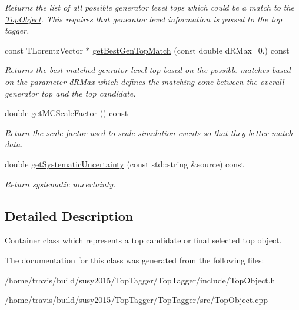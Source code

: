 \begin{DoxyCompactItemize}
\begin{DoxyCompactList}\small\item\em Returns the list of all possible generator level tops which could be a match to the \hyperlink{classTopObject}{Top\-Object}. This requires that generator level information is passed to the top tagger. \end{DoxyCompactList}\item 
\hypertarget{classTopObject_a80c459ce3d60d1402087ceead3999e45}{const T\-Lorentz\-Vector $\ast$ \hyperlink{classTopObject_a80c459ce3d60d1402087ceead3999e45}{get\-Best\-Gen\-Top\-Match} (const double d\-R\-Max=0.) const }\label{classTopObject_a80c459ce3d60d1402087ceead3999e45}

\begin{DoxyCompactList}\small\item\em Returns the best matched genrator level top based on the possible matches based on the parameter d\-R\-Max which defines the matching cone between the overall generator top and the top candidate. \end{DoxyCompactList}\item 
\hypertarget{classTopObject_a77edcc1258a253b60747eb557c12dd52}{double \hyperlink{classTopObject_a77edcc1258a253b60747eb557c12dd52}{get\-M\-C\-Scale\-Factor} () const }\label{classTopObject_a77edcc1258a253b60747eb557c12dd52}

\begin{DoxyCompactList}\small\item\em Return the scale factor used to scale simulation events so that they better match data. \end{DoxyCompactList}\item 
\hypertarget{classTopObject_add523f130ec310825913f90f2ad92cd1}{double \hyperlink{classTopObject_add523f130ec310825913f90f2ad92cd1}{get\-Systematic\-Uncertainty} (const std\-::string \&source) const }\label{classTopObject_add523f130ec310825913f90f2ad92cd1}

\begin{DoxyCompactList}\small\item\em Return systematic uncertainty. \end{DoxyCompactList}\end{DoxyCompactItemize}


\subsection{Detailed Description}
Container class which represents a top candidate or final selected top object. 

The documentation for this class was generated from the following files\-:\begin{DoxyCompactItemize}
\item 
/home/travis/build/susy2015/\-Top\-Tagger/\-Top\-Tagger/include/Top\-Object.\-h\item 
/home/travis/build/susy2015/\-Top\-Tagger/\-Top\-Tagger/src/Top\-Object.\-cpp\end{DoxyCompactItemize}
